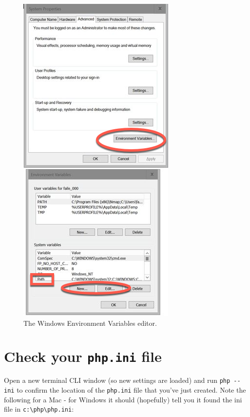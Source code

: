 \documentclass[a4paperpaper,openright]{book}
\newenvironment{Shaded}{}{}
\newcommand{\ExtensionTok}[1]{#1}
\newcommand{\NormalTok}[1]{#1}
\begin{document}
\begin{figure}
\centering
\includegraphics{./tex2pdf.-56818c273b0f887e/eb1ab9d21c784b824e4103ff64f0448e7b0e6122.png}
\caption{The Windows Environment Variables editor. \label{env2}}
\end{figure}

\hypertarget{check-your-php.ini-file}{%
\section{\texorpdfstring{Check your \texttt{php.ini}
file}{Check your php.ini file}}\label{check-your-php.ini-file}}

Open a new terminal CLI window (so new settings are loaded) and run
\texttt{php\ -\/-ini} to confirm the location of the \texttt{php.ini}
file that you've just created. Note the following for a Mac - for
Windows it should (hopefully) tell you it found the ini file in
\texttt{c:\textbackslash{}php\textbackslash{}php.ini}:

\begin{Shaded}
\end{Shaded}
\end{document}
